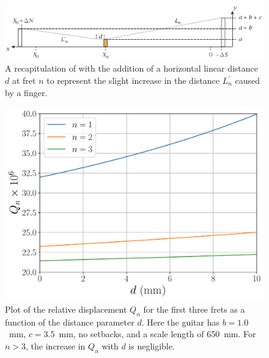  \begin{figure}
  \centering
  \includegraphics[width=6.0in]{figures/fretting_schematic}
  \caption{\label{fig:fretting_schematic} A recapitulation of  with the addition of a horizontal linear distance $d$ at fret $n$ to represent the slight increase in the distance $L_n^\prime$ caused by a finger.}
 \end{figure}




 \begin{figure}
  \centering
  \includegraphics[width=6.0in]{figures/fret_model}
  \caption{\label{fig:fret_model} Plot of the relative displacement $Q_n$ for the first three frets as a function of the distance parameter $d$. Here the guitar has $b = 1.0$~mm, $c = 3.5$~mm, no setbacks, and a scale length of 650~mm. For $n > 3$, the increase in $Q_n$ with $d$ is negligible.}
 \end{figure}



